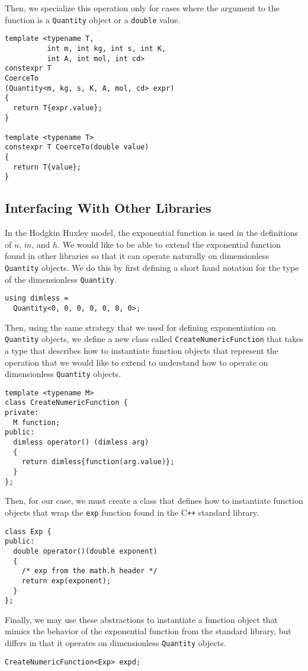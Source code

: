 \documentclass[reprint]{revtex4-1}
\begin{document}
Then, we specialize this operation only for cases where the argument to the function is a \verb|Quantity| object
or a \verb|double| value.
\begin{verbatim}
template <typename T,
          int m, int kg, int s, int K,
          int A, int mol, int cd>
constexpr T 
CoerceTo
(Quantity<m, kg, s, K, A, mol, cd> expr)
{
  return T{expr.value};
}
 
template <typename T>
constexpr T CoerceTo(double value)
{
  return T{value};
}
\end{verbatim}

\subsection{Interfacing With Other Libraries}
In the Hodgkin Huxley model, the exponential function is used in the definitions of $\dot{n}$, $\dot{m}$, and
$\dot{h}$. We would like to be able to extend the exponential function found in other libraries so that it
can operate naturally on dimensionless \verb|Quantity| objects. We do this by first defining a short hand
notation for the type of the dimensionless \verb|Quantity|.
\begin{verbatim}
using dimless =
  Quantity<0, 0, 0, 0, 0, 0, 0>;
\end{verbatim}

Then, using the same strategy that we used for defining exponentiation on \verb|Quantity| objects, we define
a new class called \verb|CreateNumericFunction| that takes a type that describes how to instantiate
function objects that represent the operation that we would like to extend to understand how to operate on
dimensionless \verb|Quantity| objects.

\begin{verbatim}
template <typename M>
class CreateNumericFunction {
private:
  M function;
public:
  dimless operator() (dimless arg)
  {
    return dimless{function(arg.value)};
  }
};
\end{verbatim}

Then, for our case, we must create a class that defines how to instantiate function objects that wrap
the \verb|exp| function found in the C\verb!++! standard library.
\begin{verbatim}
class Exp {
public:
  double operator()(double exponent)
  {
    /* exp from the math.h header */
    return exp(exponent);
  }
};
\end{verbatim}

Finally, we may use these abstractions to instantiate a function object that mimics the
behavior of the exponential function from the standard library, but differs in that it
operates on dimensionless \verb|Quantity| objects.
\begin{verbatim}
CreateNumericFunction<Exp> expd;
\end{verbatim}
\end{document}
